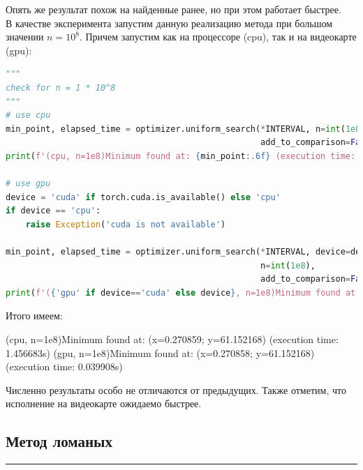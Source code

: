 \documentclass[a4paper, 14pt]{extarticle}
\begin{document}
Опять же результат похож на найденные ранее, но при этом работает быстрее.\\

В качестве эксперимента запустим данную реализацию метода при большом значении 
$n = 10^8$. Причем запустим как на процессоре (cpu), так и на видеокарте (gpu):

\begin{center}
    \begin{lstlisting}[language=Python]
""" 
check for n = 1 * 10^8
"""
# use cpu
min_point, elapsed_time = optimizer.uniform_search(*INTERVAL, n=int(1e8), 
                                                   add_to_comparison=False)
print(f'(cpu, n=1e8)Minimum found at: {min_point:.6f} (execution time: {elapsed_time:.6f}s)')

# use gpu
device = 'cuda' if torch.cuda.is_available() else 'cpu'
if device == 'cpu':
    raise Exception('cuda is not available')

min_point, elapsed_time = optimizer.uniform_search(*INTERVAL, device=device, 
                                                   n=int(1e8), 
                                                   add_to_comparison=False)
print(f'({'gpu' if device=='cuda' else device}, n=1e8)Minimum found at: {min_point:.6f} (execution time: {elapsed_time:.6f}s)')
    \end{lstlisting}
\end{center}

Итого имеем:

\begin{center}
    (cpu, n=1e8)Minimum found at: (x=0.270859; y=61.152168) (execution time: 1.456683s)
    (gpu, n=1e8)Minimum found at: (x=0.270858; y=61.152168) (execution time: 0.039908s)
\end{center}

Численно результаты особо не отличаются от предыдущих. Также отметим, что исполнение на 
видеокарте ожидаемо быстрее.


\subsection*{Метод ломаных}\vspace{-20pt}\rule{\linewidth}{0.1mm}
\vspace{-30pt}
\end{document}
